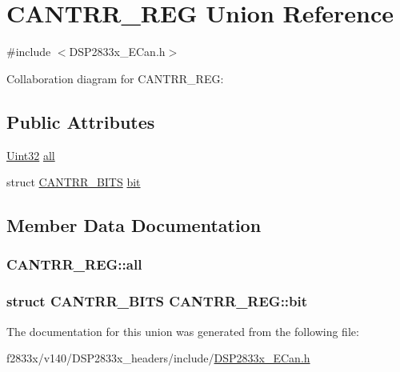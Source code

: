 \hypertarget{union_c_a_n_t_r_r___r_e_g}{}\section{C\+A\+N\+T\+R\+R\+\_\+\+R\+E\+G Union Reference}
\label{union_c_a_n_t_r_r___r_e_g}


{\ttfamily \#include $<$D\+S\+P2833x\+\_\+\+E\+Can.\+h$>$}



Collaboration diagram for C\+A\+N\+T\+R\+R\+\_\+\+R\+E\+G\+:
\subsection*{Public Attributes}
\begin{DoxyCompactItemize}
\item 
\hyperlink{_d_s_p2833x___device_8h_aba99025e657f892beb7ff31cecf64653}{Uint32} \hyperlink{union_c_a_n_t_r_r___r_e_g_afe0f561d45a7441477d13bb6d8cfbe53}{all}
\item 
struct \hyperlink{struct_c_a_n_t_r_r___b_i_t_s}{C\+A\+N\+T\+R\+R\+\_\+\+B\+I\+T\+S} \hyperlink{union_c_a_n_t_r_r___r_e_g_a23912fe201ca39d048966679d93a3c6f}{bit}
\end{DoxyCompactItemize}


\subsection{Member Data Documentation}
\hypertarget{union_c_a_n_t_r_r___r_e_g_afe0f561d45a7441477d13bb6d8cfbe53}{}
\subsubsection[{all}]{ C\+A\+N\+T\+R\+R\+\_\+\+R\+E\+G\+::all}\label{union_c_a_n_t_r_r___r_e_g_afe0f561d45a7441477d13bb6d8cfbe53}
\hypertarget{union_c_a_n_t_r_r___r_e_g_a23912fe201ca39d048966679d93a3c6f}{}
\subsubsection[{bit}]{\setlength{\rightskip}{0pt plus 5cm}struct {\bf C\+A\+N\+T\+R\+R\+\_\+\+B\+I\+T\+S} C\+A\+N\+T\+R\+R\+\_\+\+R\+E\+G\+::bit}\label{union_c_a_n_t_r_r___r_e_g_a23912fe201ca39d048966679d93a3c6f}


The documentation for this union was generated from the following file\+:\begin{DoxyCompactItemize}
\item 
f2833x/v140/\+D\+S\+P2833x\+\_\+headers/include/\hyperlink{_d_s_p2833x___e_can_8h}{D\+S\+P2833x\+\_\+\+E\+Can.\+h}\end{DoxyCompactItemize}
